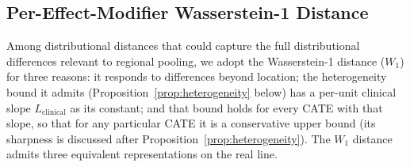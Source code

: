\documentclass[AMA,Times1COL]{WileyNJDv5}
\begin{document}
\subsection{Per-Effect-Modifier Wasserstein-1 Distance}\label{sec:nabcd_metric}

Among distributional distances that could capture the full distributional differences relevant to regional pooling, we adopt the Wasserstein-1 distance ($W_1$) for three reasons: it responds to differences beyond location; the heterogeneity bound it admits (Proposition~\ref{prop:heterogeneity} below) has a per-unit clinical slope $L_{\text{clinical}}$ as its constant; and that bound holds for every CATE with that slope, so that for any particular CATE it is a conservative upper bound (its sharpness is discussed after Proposition~\ref{prop:heterogeneity}). The $W_1$ distance admits three equivalent representations on the real line.\cite{villani2009,vallender1974}
\end{document}
